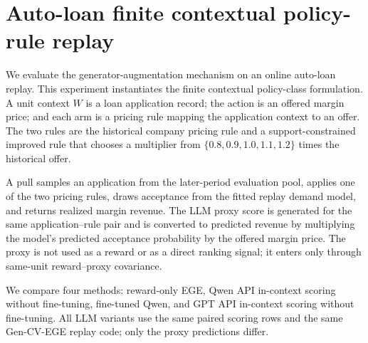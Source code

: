 \section{Auto-loan finite contextual policy-rule replay}
\label{sec:autoloan-llm-replay}

We evaluate the generator-augmentation mechanism on an online auto-loan replay. This experiment instantiates the finite contextual policy-class formulation. A unit context \(W\) is a loan application record; the action is an offered margin price; and each arm is a pricing rule mapping the application context to an offer. The two rules are the historical company pricing rule and a support-constrained improved rule that chooses a multiplier from \(\{0.8,0.9,1.0,1.1,1.2\}\) times the historical offer.

A pull samples an application from the later-period evaluation pool, applies one of the two pricing rules, draws acceptance from the fitted replay demand model, and returns realized margin revenue. The LLM proxy score is generated for the same application--rule pair and is converted to predicted revenue by multiplying the model's predicted acceptance probability by the offered margin price. The proxy is not used as a reward or as a direct ranking signal; it enters only through same-unit reward--proxy covariance.

We compare four methods: reward-only EGE, Qwen API in-context scoring without fine-tuning, fine-tuned Qwen, and GPT API in-context scoring without fine-tuning. All LLM variants use the same paired scoring rows and the same Gen-CV-EGE replay code; only the proxy predictions differ.
